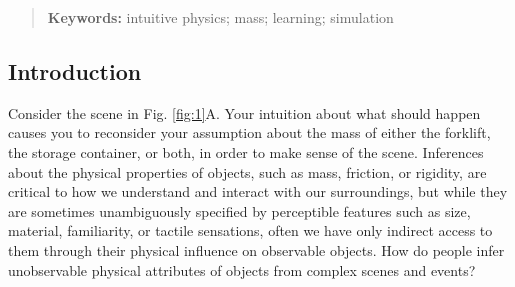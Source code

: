 \documentclass[10pt,letterpaper]{article}
\begin{document}
\begin{abstract}

  \textbf{Keywords:} intuitive physics; mass; learning; simulation
\end{abstract}
\subsection{Introduction}
Consider the scene in Fig. \ref{fig:1}A. Your intuition about what
should happen causes you to reconsider your assumption about the mass
of either the forklift, the storage container, or both, in order to
make sense of the scene. Inferences about the physical properties of
objects, such as mass, friction, or rigidity, are critical to how we
understand and interact with our surroundings, but while they are
sometimes unambiguously specified by perceptible features such as
size, material, familiarity, or tactile sensations, often we have only
indirect access to them through their physical influence on observable
objects. How do people infer unobservable physical attributes of
objects from complex scenes and events?
\end{document}
